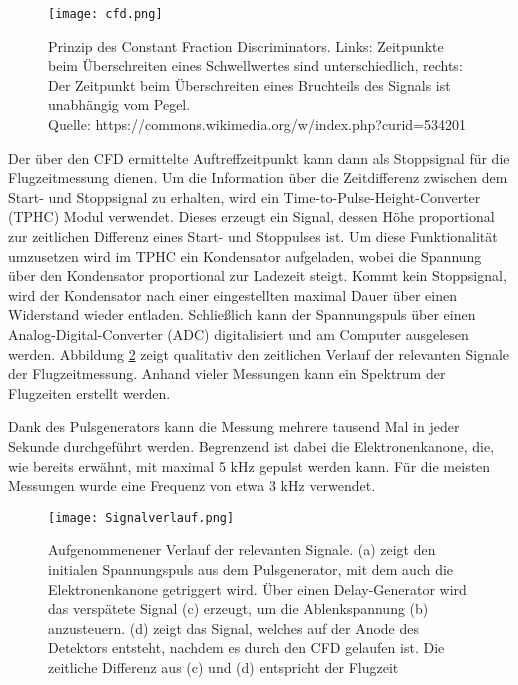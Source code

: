 \begin{figure}
    \centering
    \texttt{[image: cfd.png]}
    \caption[Prinzip des Constant Fraction Discriminators]{Prinzip des Constant Fraction Discriminators. Links: Zeitpunkte beim Überschreiten eines Schwellwertes sind unterschiedlich, rechts: Der Zeitpunkt beim Überschreiten eines Bruchteils des Signals ist unabhängig vom Pegel.\\
    \small Quelle: https://commons.wikimedia.org/w/index.php?curid=534201}
    \label{fig:CFD} 
\end{figure}

Der über den CFD ermittelte Auftreffzeitpunkt kann dann als Stoppsignal für die Flugzeitmessung dienen. Um die Information über die Zeitdifferenz zwischen dem Start- und Stoppsignal zu erhalten, wird ein Time-to-Pulse-Height-Converter (TPHC) Modul verwendet. Dieses erzeugt ein Signal, dessen Höhe proportional zur zeitlichen Differenz eines Start- und Stoppulses ist. Um diese Funktionalität umzusetzen wird im TPHC ein Kondensator aufgeladen, wobei die Spannung über den Kondensator proportional zur Ladezeit steigt. Kommt kein Stoppsignal, wird der Kondensator nach einer eingestellten maximal Dauer über einen Widerstand wieder entladen. Schließlich kann der Spannungspuls über einen Analog-Digital-Converter (ADC) digitalisiert und am Computer ausgelesen werden. Abbildung \ref{fig:Signal} zeigt qualitativ den zeitlichen Verlauf der relevanten Signale der Flugzeitmessung. Anhand vieler Messungen kann ein Spektrum der Flugzeiten erstellt werden.

Dank des Pulsgenerators kann die Messung mehrere tausend Mal in jeder Sekunde durchgeführt werden. Begrenzend ist dabei die Elektronenkanone, die, wie bereits erwähnt, mit maximal 5 kHz gepulst werden kann. Für die meisten Messungen wurde eine Frequenz von etwa 3 kHz verwendet.

\begin{figure}
    \centering
    \texttt{[image: Signalverlauf.png]}
    \caption[Aufgenommenener Verlauf der relevanten Signale der ToF-Messung]{Aufgenommenener Verlauf der relevanten Signale. (a) zeigt den initialen Spannungspuls aus dem Pulsgenerator, mit dem auch die Elektronenkanone getriggert wird. Über einen Delay-Generator wird das verspätete Signal (c) erzeugt, um die Ablenkspannung (b) anzusteuern. (d) zeigt das Signal, welches auf der Anode des Detektors entsteht, nachdem es durch den CFD gelaufen ist. Die zeitliche Differenz aus (c) und (d) entspricht der Flugzeit}
    \label{fig:Signal} 
\end{figure}

